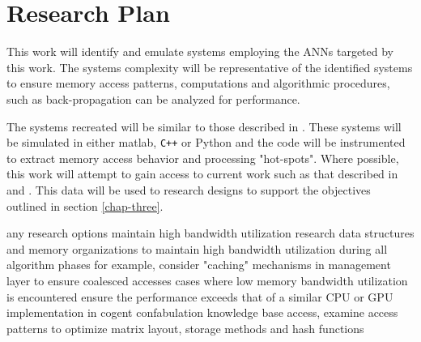 
\section{Research Plan}
\label{chap-six}

This work will identify and emulate systems employing the ANNs targeted by this work. The systems complexity will be representative of the identified systems
to ensure memory access patterns, computations and algorithmic procedures, such as back-propagation can be analyzed for performance.

The systems recreated will be similar to those described in \cite{krizhevsky2012imagenet}\cite{qiu2013parallel}\cite{mnih2013playing}.
These systems will be simulated in either matlab, \verb!C++! or Python and the code will be instrumented to extract memory access behavior and
processing "hot-spots".
Where possible, this work will attempt to gain access to current work such as that described in \cite{qiu2013parallel} and \cite{tensorflow2015-whitepaper}.
This data will be used to research designs to support the objectives outlined in section \ref{chap-three}.


\begin{outline}
\renewcommand{\outlinei}{enumerate}
  \vspace{-3mm}
  \1 any research options maintain high bandwidth utilization
    \vspace{-3mm}
    \2 research data structures and memory organizations to maintain high bandwidth utilization during all algorithm phases
      \3 for example, consider "caching" mechanisms in management layer to ensure coalesced accesses
  \vspace{-3mm}
  \1 cases where low memory bandwidth utilization is encountered ensure the performance
        exceeds that of a similar CPU or GPU implementation
    \vspace{-3mm}
    \2 in cogent confabulation knowledge base access, examine access patterns to optimize matrix layout, storage methods and hash functions
\end{outline}

